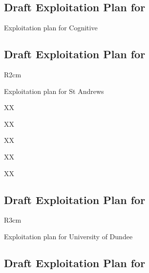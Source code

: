 \documentclass[a4paper,11pt]{article}
\begin{document}
\horizontalline

\pagebreak

\subsection*{Draft Exploitation Plan for \COGNIshort{}}
\vspace{-6pt}


Exploitation plan for Cognitive

\horizontalline

\subsection*{Draft Exploitation Plan for \SAshort{}}

\begin{wrapfigure}{R}{2cm}
\vspace{-1.4cm}
\hfill {}
\vspace{-0.9cm}
\end{wrapfigure}

Exploitation plan for St Andrews

XX

XX

XX

XX

XX

\horizontalline

\subsection*{Draft Exploitation Plan for \UODshort{}}

\begin{wrapfigure}{R}{3cm}
\vspace{-1.4cm}
\hfill {}
\vspace{-0.9cm}
\end{wrapfigure}

Exploitation plan for University of Dundee

\horizontalline

\subsection*{Draft Exploitation Plan for \UCMshort{}}
\end{document}

